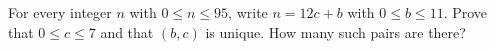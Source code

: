 For every integer $n$ with $0\le n\le95$, write $n=12c+b$ with $0\le b\le11$. Prove that $0\le c\le7$ and that $(b,c)$ is unique. How many such pairs are there?
